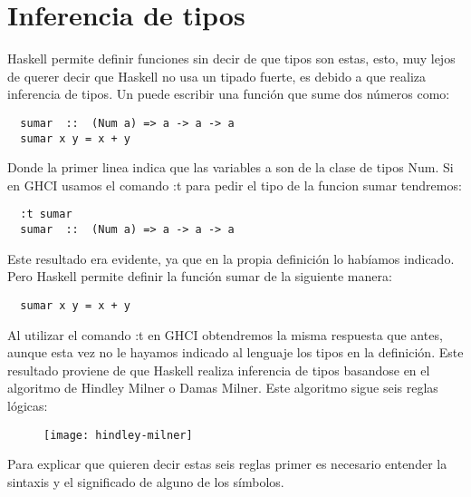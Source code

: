 \section{Inferencia de tipos} %
\label{sec:inferencia_de_tipos}


Haskell permite definir funciones sin decir de que tipos son estas, esto, muy lejos de querer decir que Haskell no usa un tipado fuerte, es debido a que realiza inferencia de tipos.
Un puede escribir una función que sume dos números como:


\begin{lstlisting}
  sumar  ::  (Num a) => a -> a -> a
  sumar x y = x + y
\end{lstlisting}

Donde la primer linea indica que las variables a son de la clase de tipos Num.
Si en GHCI usamos el comando :t para pedir el tipo de la funcion sumar tendremos:


\begin{lstlisting}
  :t sumar
  sumar  ::  (Num a) => a -> a -> a
\end{lstlisting}

Este resultado era evidente, ya que en la propia definición lo habíamos indicado. Pero Haskell permite definir la función sumar de la siguiente manera:

\begin{lstlisting}
  sumar x y = x + y
\end{lstlisting}

Al utilizar el comando :t en GHCI obtendremos la misma respuesta que antes, aunque esta vez no le  hayamos indicado al lenguaje los tipos en la definición.
Este resultado proviene de que Haskell realiza inferencia de tipos basandose en el algoritmo de Hindley Milner o Damas Milner.
Este algoritmo sigue seis reglas lógicas:
\begin{figure}[H]
\texttt{[image: hindley-milner]}
\end{figure}

Para explicar que quieren decir estas seis reglas primer es necesario entender la sintaxis y el significado de alguno de los símbolos.


